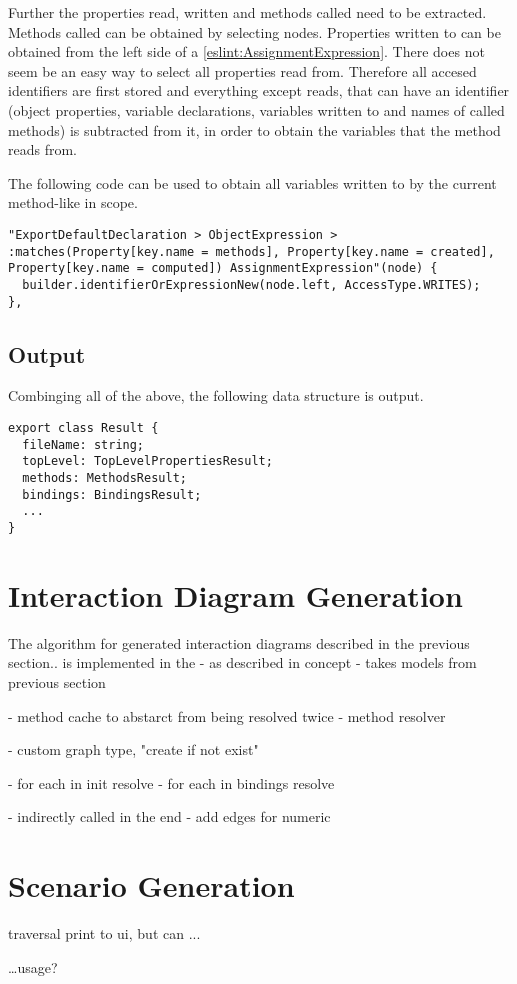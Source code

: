 Further the properties read, written and methods called need to be extracted. Methods called can be obtained by selecting  nodes. Properties written to can be obtained from the left side of a  \ref{eslint:AssignmentExpression}.
There does not seem be an easy way to select all properties read from. Therefore all accesed identifiers are first stored and everything except reads, that can have an identifier (object properties, variable declarations, variables written to and names of called methods) is subtracted from it, in order to obtain the variables that the method reads from.

The following code can be used to obtain all variables written to by the current method-like in scope. 
\begin{lstlisting}
"ExportDefaultDeclaration > ObjectExpression > 
:matches(Property[key.name = methods], Property[key.name = created],
Property[key.name = computed]) AssignmentExpression"(node) {
  builder.identifierOrExpressionNew(node.left, AccessType.WRITES);
},
\end{lstlisting}
\subsection{Output}
Combinging all of the above, the following data structure is output.
\begin{lstlisting}
export class Result {
  fileName: string;
  topLevel: TopLevelPropertiesResult;
  methods: MethodsResult;
  bindings: BindingsResult;
  ...
}
\end{lstlisting}
\section{Interaction Diagram Generation}
The algorithm for generated interaction diagrams described in the previous section.. is implemented in the 
- as described in concept
- takes models from previous section

- method cache to abstarct from being resolved twice
- method resolver

- custom graph type, "create if not exist" 

- for each in init resolve
- for each in bindings resolve

- indirectly called in the end %
- add edges for numeric

\section{Scenario Generation}

traversal
print to ui, but can ...

\ldots usage?
